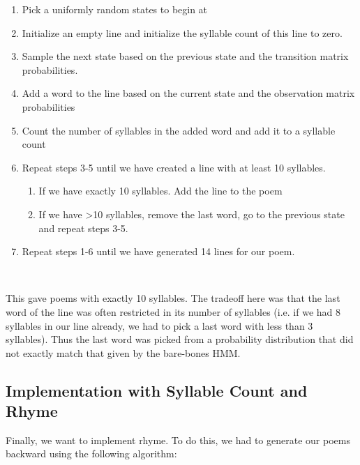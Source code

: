 \begin{enumerate}

\item Pick a uniformly random states to begin at

\item Initialize an empty line and initialize the syllable count of this line to zero.

\item Sample the next state based on the previous state and the transition matrix probabilities.

\item Add a word to the line based on the current state and the observation matrix probabilities

\item Count the number of syllables in the added word and add it to a syllable count

\item Repeat steps 3-5 until we have created a line with at least 10 syllables. 

\begin{enumerate}

\item If we have exactly 10 syllables. Add the line to the poem

\item If we have \textgreater 10 syllables, remove the last word, go to the previous state and repeat steps 3-5.

\end{enumerate}

\item Repeat steps 1-6 until we have generated 14 lines for our poem.

\end{enumerate}
~

This gave poems with exactly 10 syllables. The tradeoff here was that the last word of the line was often restricted in its number of syllables (i.e. if we had 8 syllables in our line already, we had to pick a last word with less than 3 syllables). Thus the last word was picked from a probability distribution that did not exactly match that given by the bare-bones HMM.

\subsection*{Implementation with Syllable Count and Rhyme}

Finally, we want to implement rhyme. To do this, we had to generate our poems backward using the following algorithm:


